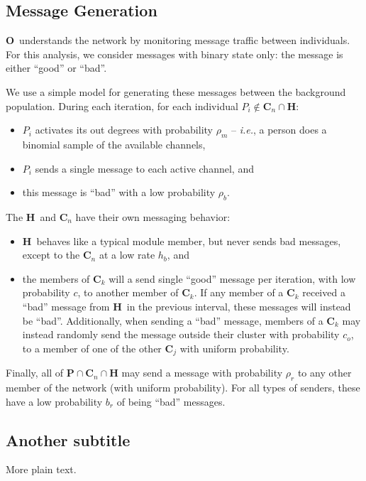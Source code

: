 \documentclass{article}
\newcommand{\Hub}[0]{\ensuremath{\mathbf{H}}}
\newcommand{\C}[1]{\ensuremath{\mathbf{C}_{#1}}}
\newcommand{\Obs}[0]{\ensuremath{\mathbf{O}}}
\begin{document}
\subsection*{Message Generation}
\Obs\ understands the network by monitoring message traffic between individuals.  For this analysis, we consider messages with binary state only: the message is either ``good'' or ``bad''.

We use a simple model for generating these messages between the background population.  During each iteration, for each individual $P_i\notin\C{n}\cap\Hub$:
\begin{itemize}
\item $P_i$ activates its out degrees with probability $\rho_m$ -- {\em i.e.}, a person does a binomial sample of the available channels,
\item $P_i$ sends a single message to each active channel, and
\item this message is ``bad'' with a low probability $\rho_b$. 
\end{itemize}
%
The \Hub\ and \C{n} have their own messaging behavior:
%
\begin{itemize}
\item \Hub\ behaves like a typical module member, but never sends bad messages, except to the \C{n} at a low rate $h_b$, and
\item the members of \C{k} will a send single ``good'' message per iteration, with low probability $c$, to another member of \C{k}.  If any member of a \C{k} received a ``bad'' message from \Hub\ in the previous interval, these messages will instead be ``bad''.  Additionally, when sending a ``bad'' message, members of a \C{k} may instead randomly send the message outside their cluster with probability $c_o$, to a member of one of the other \C{j} with uniform probability.
\end{itemize}

Finally, all of $\mathbf{P}\cap\C{n}\cap\Hub$ may send a message with probability $\rho_r$ to any other member of the network (with uniform probability).  For all types of senders, these have a low probability $b_r$ of being ``bad'' messages.

\subsection{Another subtitle}

More plain text.

\newpage


\end{document}
